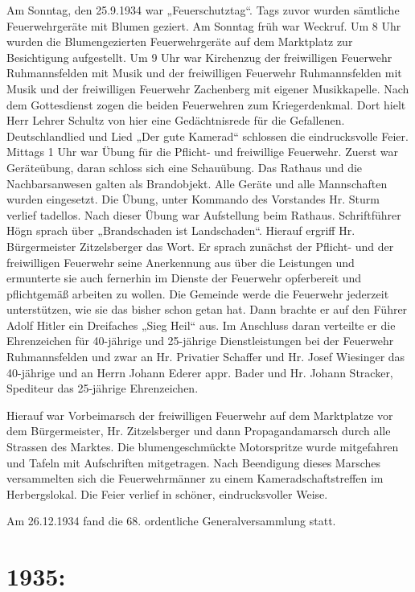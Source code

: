 \documentclass[12pt,a4paper]{book}
\begin{document}
Am Sonntag, den 25.9.1934 war „Feuerschutztag“. Tags zuvor wurden sämtliche
Feuerwehrgeräte mit Blumen geziert. Am Sonntag früh war Weckruf. Um 8 Uhr wurden
die Blumengezierten Feuerwehrgeräte auf dem Marktplatz zur Besichtigung
aufgestellt. Um 9 Uhr war Kirchenzug der freiwilligen Feuerwehr Ruhmannsfelden
mit Musik und der freiwilligen Feuerwehr Ruhmannsfelden mit Musik und der
freiwilligen Feuerwehr Zachenberg mit eigener Musikkapelle. Nach dem
Gottesdienst zogen die beiden Feuerwehren zum Kriegerdenkmal. Dort hielt Herr
Lehrer Schultz von hier eine Gedächtnisrede für die Gefallenen. Deutschlandlied
und Lied „Der gute Kamerad“ schlossen die eindrucksvolle Feier. Mittags 1 Uhr
war Übung für die Pflicht- und freiwillige Feuerwehr. Zuerst war Geräteübung,
daran schloss sich eine Schauübung. Das Rathaus und die Nachbarsanwesen galten
als Brandobjekt. Alle Geräte und alle Mannschaften wurden eingesetzt. Die Übung,
unter Kommando des Vorstandes Hr. Sturm verlief tadellos. Nach dieser Übung war
Aufstellung beim Rathaus. Schriftführer Högn sprach über „Brandschaden ist
Landschaden“. Hierauf ergriff Hr. Bürgermeister Zitzelsberger das Wort. Er
sprach zunächst der Pflicht- und der freiwilligen Feuerwehr seine Anerkennung
aus über die Leistungen und ermunterte sie auch fernerhin im Dienste der
Feuerwehr opferbereit und pflichtgemäß arbeiten zu wollen. Die Gemeinde werde
die Feuerwehr jederzeit unterstützen, wie sie das bisher schon getan hat. Dann
brachte er auf den Führer Adolf Hitler ein Dreifaches „Sieg Heil“ aus. Im
Anschluss daran verteilte er die Ehrenzeichen für 40-jährige und 25-jährige
Dienstleistungen bei der Feuerwehr Ruhmannsfelden und zwar an Hr. Privatier
Schaffer und Hr. Josef Wiesinger das 40-jährige und an Herrn Johann Ederer appr.
Bader und Hr. Johann Stracker, Spediteur das 25-jährige Ehrenzeichen.

Hierauf war Vorbeimarsch der freiwilligen Feuerwehr auf dem     Marktplatze vor
dem Bürgermeister, Hr. Zitzelsberger und dann Propagandamarsch durch alle
Strassen des Marktes. Die blumengeschmückte Motorspritze wurde mitgefahren und
Tafeln mit Aufschriften mitgetragen. Nach Beendigung dieses Marsches
versammelten sich die Feuerwehrmänner zu einem Kameradschaftstreffen im
Herbergslokal. Die Feier verlief in schöner, eindrucksvoller Weise.

Am 26.12.1934 fand die 68. ordentliche Generalversammlung statt.

\section{1935:}
\end{document}
